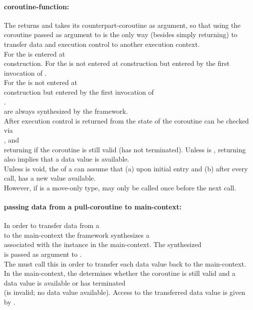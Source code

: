 \paragraph*{coroutine-function:}
The \corofunction returns  and takes its counterpart-coroutine as
argument, so that using the coroutine passed as argument to \corofunction is the
only way (besides simply returning) to transfer data and execution control to
another execution context.\\
\newline
For \pullcoro the \corofunction is entered at\\
\pullcoro construction.
For \pushcoro the \corofunction is not entered at \pushcoro construction but
entered by the first invocation of \pushcoroop.\\
\newline
For \callcoro the \corofunction is not entered at\\
\callcoro construction but entered by the first invocation of\\
\callcoroop.\\
\yieldcoro are always synthesized by the framework.\\
After execution control is returned from \corofunction the state of the
coroutine can be checked via\\
\pullcorobool, \pushcorobool and\\
\callcorobool returning  if the coroutine is still valid (\corofunction has
not terminated).
\newline
Unless  is , \pullcorobool returning  also implies
that a data value is available.\\
\newline
Unless  is void, the \corofunction of a \callcoro
can assume that (a) upon initial entry and (b) after every \yieldcoroop call,
\yieldcoroget has a new value available.\\
However, if  is a move-only type, \yieldcoroget may
only be called once before the next \yieldcoroop call.

\paragraph*{passing data from a pull-coroutine to main-context:}
In order to transfer data from a\\
\pullcoro to the main-context the framework synthesizes a\\
\pushcoro associated
with the \pullcoro instance in the main-context. The synthesized\\
\pushcoro is passed as argument to \corofunction.\\
The \corofunction must call this \pushcoroop in order to transfer each
data value back to the main-context.\\
In the main-context, the \pullcorobool determines whether the coroutine is still
valid and a data value is available or \corofunction has terminated\\
(\pullcoro is invalid; no data value available). Access to the transferred data
value is given by \pullcoroget.

